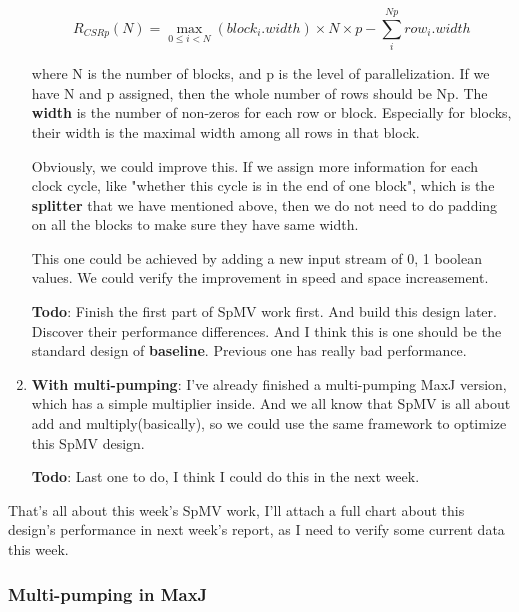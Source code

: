 \begin{enumerate}
\[ R_{CSRp}(N) = 
	\max_{0 \leq i < N}(block_i.width)\times N \times p - 
	\sum_{i}^{Np} row_i.width 
\]

where N is the number of blocks, and p is the level of parallelization. If we have N and p assigned, then the whole number of rows should be Np. The \textbf{width} is the number of non-zeros for each row or block. Especially for blocks, their width is the maximal width among all rows in that block.

Obviously, we could improve this. If we assign more information for each clock cycle, like "whether this cycle is in the end of one block", which is the \textbf{splitter} that we have mentioned above, then we do not need to do padding on all the blocks to make sure they have same width.

This one could be achieved by adding a new input stream of 0, 1 boolean values. We could verify the improvement in speed and space increasement.

\textbf{Todo}: Finish the first part of SpMV work first. And build this design later. Discover their performance differences. And I think this is one should be the standard design of \textbf{baseline}. Previous one has really bad performance.

\item
\textbf{With multi-pumping}: I've already finished a multi-pumping MaxJ version, which has a simple multiplier inside. And we all know that SpMV is all about add and multiply(basically), so we could use the same framework to optimize this SpMV design.

\textbf{Todo}: Last one to do, I think I could do this in the next week.
\end{enumerate}

That's all about this week's SpMV work, I'll attach a full chart about this design's performance in next week's report, as I need to verify some current data this week.

\subsubsection{Multi-pumping in MaxJ}
